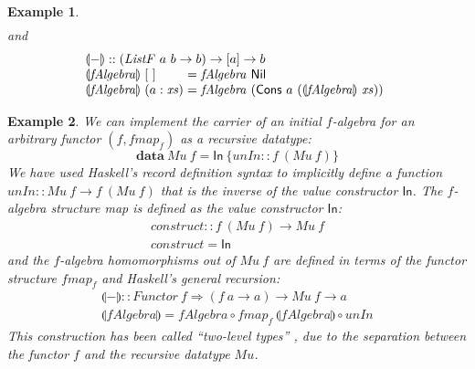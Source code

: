 \documentclass{jfp1}
\newcommand{\fold}[1]{\llparenthesis #1 \rrparenthesis}
\newtheorem{example}{Example}
\newcommand{\kw}[1]{\textbf{#1}}
\begin{document}
\begin{example}
\begin{displaymath}
\begin{array}{l}
    \end{array}
  \end{displaymath}
  and
  \begin{displaymath}
    \begin{array}{l}
      \fold{-} :: (\mathit{ListF}~a~b \to b) \to [a] \to b \\
      \begin{array}{@{}l@{\hspace{0.3em}}l@{\hspace{0.3em}}c@{\hspace{0.3em}}l}
        \fold{\mathit{fAlgebra}}&[~]&=&\mathit{fAlgebra}~\mathsf{Nil} \\
        \fold{\mathit{fAlgebra}}&(a : \mathit{xs})&=&\mathit{fAlgebra}~(\mathsf{Cons}~a~(\fold{\mathit{fAlgebra}}~\mathit{xs}))
      \end{array}
    \end{array}
  \end{displaymath}
\end{example}

\begin{example}
  We can implement the carrier of an initial $f$-algebra for an arbitrary
  functor $(f, \mathit{fmap}_f)$ as a recursive datatype:
  \begin{displaymath}
    \kw{data}~\mathit{Mu}~f = \mathsf{In}~\{ \mathit{unIn} :: f~(\mathit{Mu}~f) \}
  \end{displaymath}
  We have used Haskell's record definition syntax to implicitly define
  a function $\mathit{unIn} :: \mathit{Mu}~f \to f~(\mathit{Mu}~f)$
  that is the inverse of the value constructor $\mathsf{In}$.  The
  $f$-algebra structure map is defined as the value
  constructor $\mathsf{In}$:
  \begin{displaymath}
    \begin{array}{l}
      \mathit{construct} :: f~(\mathit{Mu}~f) \to \mathit{Mu}~f \\
      \mathit{construct} = \mathsf{In}
    \end{array}
  \end{displaymath}
  and the $f$-algebra homomorphisms out of $\mathit{Mu}~f$ are defined
  in terms of the functor structure $\mathit{fmap}_f$ and Haskell's
  general recursion:
  \begin{displaymath}
    \begin{array}{l}
      \fold{-} :: \mathit{Functor}~f \Rightarrow (f~a \to a) \to \mathit{Mu}~f \to a \\
      \fold{\mathit{fAlgebra}} = \mathit{fAlgebra} \circ \mathit{fmap}_f~\fold{\mathit{fAlgebra}} \circ \mathit{unIn}
    \end{array}
  \end{displaymath}
  This construction has been called ``two-level types''
  \cite{sheard04twolevel}, due to the separation between the functor
  $f$ and the recursive datatype $\mathit{Mu}$.
\end{example}
\end{document}
